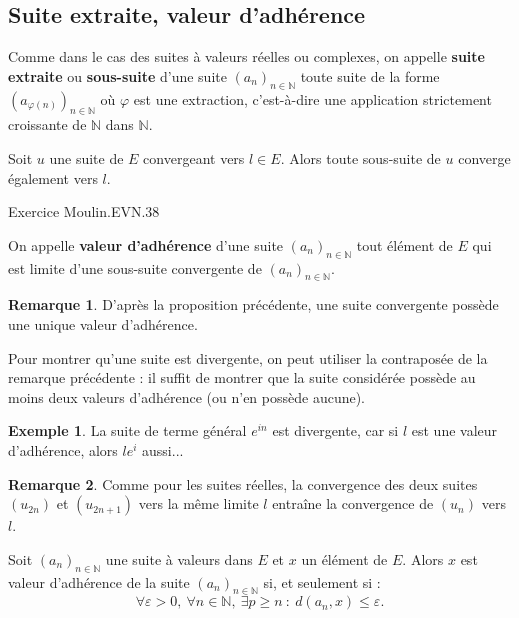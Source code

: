 \documentclass[french]{article}
\newcommand{\N}{\mathbb{N}}
\theoremstyle{plain}
\theoremstyle{definition}
\newtheorem*{ex}{Exemple}
\newtheorem*{rmq}{Remarque}
\theoremstyle{remark}
\begin{document}
\subsection{Suite extraite, valeur d'adhérence}

Comme dans le cas des suites à valeurs réelles ou complexes, on appelle \textbf{suite extraite} ou \textbf{sous-suite} d'une suite $(a_n)_{n\in\N}$ toute suite de la forme $(a_{\varphi(n)})_{n\in\N}$ où $\varphi$ est une extraction, c'est-à-dire une application strictement croissante de $\N$ dans $\N$.

\begin{prop}%
	Soit $u$ une suite de $E$ convergeant vers $l\in E$. Alors toute sous-suite de $u$ converge également vers $l$.
\end{prop}

Exercice Moulin.EVN.38

\begin{dfn}
	On appelle \textbf{valeur d'adhérence} d'une suite $(a_n)_{n\in\N}$ tout élément de $E$ qui est limite d'une sous-suite convergente de $(a_n)_{n\in\N}$.
\end{dfn}

\begin{rmq}
	D'après la proposition précédente, une suite convergente possède une unique valeur d'adhérence.
\end{rmq}

\begin{met}
	Pour montrer qu'une suite est divergente, on peut utiliser la contraposée de la remarque précédente : il suffit de montrer que la suite considérée possède au moins deux valeurs d'adhérence (ou n'en possède aucune).
\end{met}

\begin{ex}
	La suite de terme général $e^{in}$ est divergente, car si $l$ est une valeur d'adhérence, alors $le^{i}$ aussi...
\end{ex}

\begin{rmq}
	Comme pour les suites réelles, la convergence des deux suites $(u_{2n})$ et $(u_{2n+1})$ vers la même limite $l$ entraîne la convergence de $(u_n)$ vers $l$.
\end{rmq}

\begin{prop}%
	Soit $(a_n)_{n\in\N}$ une suite à valeurs dans $E$ et $x$ un élément de $E$. Alors $x$ est valeur d'adhérence de la suite $(a_n)_{n\in\N}$ si, et seulement si : $$\forall\varepsilon>0,\ \forall n\in\N,\ \exists p\geqslant n\ : \ d(a_n,x)\leqslant\varepsilon.$$
\end{prop}
\end{document}
